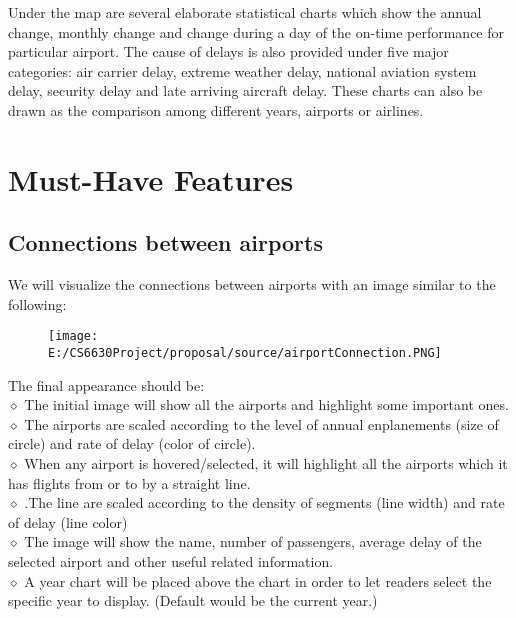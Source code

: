 \documentclass[12pt]{article}
\begin{document}
Under the map are several elaborate statistical charts which show the annual change, monthly change and change during a day of the on-time performance for particular airport. The cause of delays is also provided under five major categories: air carrier delay, extreme weather delay, national aviation system delay, security delay and late arriving aircraft delay. These charts can also be drawn as the comparison among different years, airports or airlines.

\section{Must-Have Features}
    \subsection{Connections between airports}
    We will visualize the connections between airports with an image similar to the following:
    \begin{figure}[H]
      \centering
      \texttt{[image: E:/CS6630Project/proposal/source/airportConnection.PNG]}
    \end{figure}
    \noindent The final appearance should be:\\
    $\diamond$ The initial image will show all the airports and highlight some important ones.\\
    $\diamond$ The airports are scaled according to the level of annual enplanements (size of circle) and rate of delay (color of circle).\\
    $\diamond$ When any airport is hovered/selected, it will highlight all the airports which it has flights from or to by a straight line.\\
    $\diamond$ .The line are scaled according to the density of segments (line width) and rate of delay (line color)\\
    $\diamond$ The image will show the name, number of passengers, average delay of the selected airport and other useful related information.\\
    $\diamond$ A year chart will be placed above the chart in order to let readers select the specific year to display. (Default would be the current year.)
\end{document}
